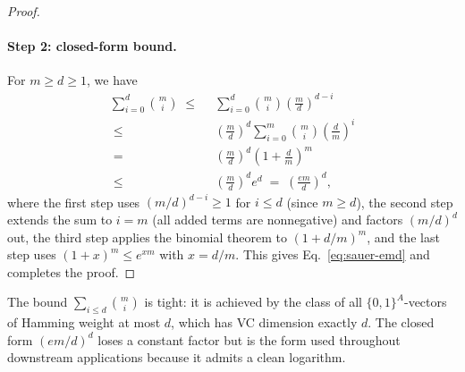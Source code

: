 \begin{proof}
\paragraph{Step 2: closed-form bound.}
For $m \ge d \ge 1$, we have
\begin{align*}
\sum_{i=0}^{d} \binom{m}{i}
\;\le\; & ~ \sum_{i=0}^{d} \binom{m}{i} \left( \frac{m}{d} \right)^{d-i} \\
\;\le\; & ~ \left( \frac{m}{d} \right)^{d} \sum_{i=0}^{m} \binom{m}{i} \left( \frac{d}{m} \right)^{i} \\
\;=\; & ~ \left( \frac{m}{d} \right)^{d} \left( 1 + \frac{d}{m} \right)^{m} \\
\;\le\; & ~ \left( \frac{m}{d} \right)^{d} e^{d} \;=\; \left( \frac{e m}{d} \right)^{d},
\end{align*}
where the first step uses $(m/d)^{d - i} \ge 1$ for $i \le d$ (since $m \ge d$), the second step extends the sum to $i = m$ (all added terms are nonnegative) and factors $(m/d)^d$ out, the third step applies the binomial theorem to $(1 + d/m)^m$, and the last step uses $(1 + x)^m \le e^{xm}$ with $x = d/m$. This gives Eq.~\eqref{eq:sauer-emd} and completes the proof.
\end{proof}

\begin{remark}\label{rem:sauer-tightness}
The bound $\sum_{i \le d} \binom{m}{i}$ is tight: it is achieved by the class of all $\{0,1\}^A$-vectors of Hamming weight at most $d$, which has VC dimension exactly $d$. The closed form $(em/d)^d$ loses a constant factor but is the form used throughout downstream applications because it admits a clean logarithm.
\end{remark}
